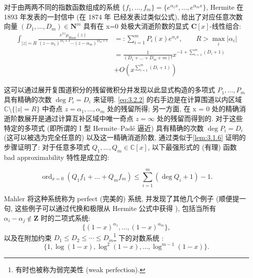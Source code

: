 \begin{remark}\label{rem:3.2.1}
对于由两两不同的指数函数组成的系统 \(\{f_1,\ldots,f_m\}=\{e^{\alpha_1x},\ldots,e^{\alpha_mx}\}\), 
Hermite 在 1893 年发表的一封信中 \cite{Her1893} (在 1874 年 \cite{Her1874} 已经发表过类似公式), 
给出了对应任意次数向量 \((D_1,\ldots,D_m)\in\mathbf{N}^m\) 具有在 x=0 处极大消逝阶数的显式 \(\mathbf{C}[x]\)-线性组合:
\begin{equation}\label{eq:3.2.2}
    \begin{aligned}
        \int_{|z|=R} \frac{e^{xz} \mu_{\text{Haar}}(z)}{(z-\alpha_1)^{D_1+1} \cdots (z-\alpha_m)^{D_m+1}} 
            &=: \sum_{i=1}^m P_i(x) e^{\alpha_i x}, \qquad R > \max_i |\alpha_i| \\
            &= \frac{1}{(D_1 + \dots + D_m + m)!} x^{-1 + \sum_{i=1}^m (D_i + 1)} \\ 
            &+ O\left(x^{\sum_{i=1}^m (D_i + 1)}\right)         
    \end{aligned}
\end{equation}


这可以通过展开复围道积分的残留微积分并发现以此显式构造的多项式 \(P_1, \ldots, P_m\) 具有精确的次数 \(\deg P_i = D_i\) 来证明. 
\eqref{eq:3.2.2} 的右手边是在计算围道以内区域 \(\mathbb{C} \setminus \{|z| = R\}\) 中奇点 \(z = \alpha_1, \ldots, \alpha_m\) 处的残留所得; 
另一方面, 在 x = 0 处的精确消逝阶数展开是通过计算互补区域中唯一奇点 \(z = \infty\) 处的残留而得到的. 
对于这些特定的多项式 (即所谓的 I 型 Hermite--Pad{\'e} 逼近) 具有精确的次数 \(\deg P_i = D_i\) (这可以被选为完全任意的) 以及这一精确消逝阶数, 
通过类似于\autoref{lem:3.1.6} 证明的步骤证明了: 对于任意多项式 \(Q_1, \ldots, Q_m \in \mathbb{C}[x]\), 
以下最强形式的 (有理) 函数 bad approximability 特性是成立的:

\begin{equation}\label{eq:3.2.3}
\operatorname{ord}_{x=0}(Q_1 f_1 + \ldots + Q_m f_m) \le \sum_{i=1}^{m} (\deg Q_i + 1) - 1.
\end{equation}

Mahler \cite{Mah68} 将这种系统称为 perfect (完美的) 系统, 并发现了其他几个例子 (顺便提一句, 这些例子可以通过代换和极限从 Hermite 公式中获得 \cite[page 331]{Chu83b}), 
包括当所有 \(\alpha_i - \alpha_j \notin \mathbf{Z}\) 时的二项式系统:
\begin{equation}\label{eq:3.2.4}
\{(1-x)^{\alpha_1},\ldots,(1-x)^{\alpha_m}\},
\end{equation}
以及在附加约束 \(D_1 \le D_2 \le \cdots \le D_m\)\footnote{有时也被称为弱完美性 (weak perfection).} 下的对数系统 \cite{Lan66}\cite{Jag64}:
\begin{equation}\label{eq:3.2.5}
\{1, \log(1-x), \log^2(1-x), \dots, \log^{m-1}(1-x)\}.
\end{equation}


\end{remark}
